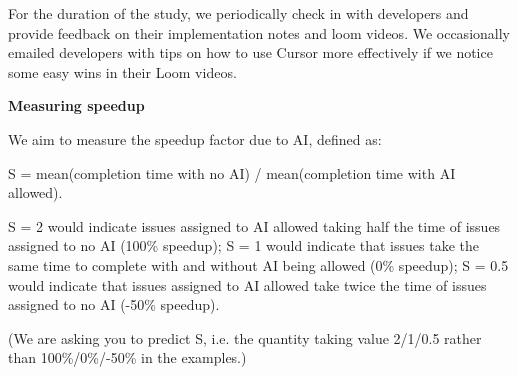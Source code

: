 \documentclass{article}
\begin{document}
\begin{instructionbox}
For the duration of the study, we periodically check in with developers and provide feedback on their implementation notes and loom videos. We occasionally emailed developers with tips on how to use Cursor more effectively if we notice some easy wins in their Loom videos.

\textbf{Measuring speedup}

We aim to measure the speedup factor due to AI, defined as:

S = mean(completion time with no AI) / mean(completion time with AI allowed).

S = 2 would indicate issues assigned to AI allowed taking half the time of issues assigned to no AI (100\% speedup); S = 1 would indicate that issues take the same time to complete with and without AI being allowed (0\% speedup); S = 0.5 would indicate that issues assigned to AI allowed take twice the time of issues assigned to no AI (-50\% speedup).

(We are asking you to predict S, i.e. the quantity taking value 2/1/0.5 rather than 100\%/0\%/-50\% in the examples.)

%

\end{instructionbox}
\end{document}
